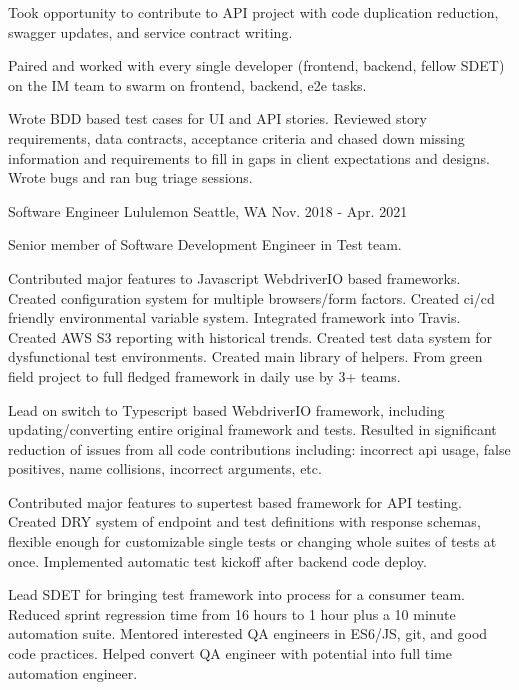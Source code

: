 \begin{cventries}
{\begin{cvitems}
\item {Took opportunity to contribute to API project with code duplication reduction, swagger updates, and service contract writing.}
\item {Paired and worked with every single developer (frontend, backend, fellow SDET) on the IM team to swarm on frontend, backend, e2e tasks.}
\item {Wrote BDD based test cases for UI and API stories. Reviewed story requirements, data contracts, acceptance criteria and chased down missing information and requirements to fill in gaps in client expectations and designs. Wrote bugs and ran bug triage sessions.}
\end{cvitems}
}

\cventry
{Software Engineer} %
{Lululemon} %
{Seattle, WA} %
{Nov. 2018 - Apr. 2021} %
{
\begin{cvitems}
\item[] {Senior member of Software Development Engineer in Test team.}
\item[]
\item {Contributed major features to Javascript WebdriverIO based frameworks. Created configuration system for multiple browsers/form factors. Created ci/cd friendly environmental variable system. Integrated framework into Travis. Created AWS S3 reporting with historical trends. Created test data system for dysfunctional test environments. Created main library of helpers. From green field project to full fledged framework in daily use by 3+ teams.}
\item {Lead on switch to Typescript based WebdriverIO framework, including updating/converting entire original framework and tests. Resulted in significant reduction of issues from all code contributions including: incorrect api usage, false positives, name collisions, incorrect arguments, etc.}
\item {Contributed major features to supertest based framework for API testing. Created DRY system of endpoint and test definitions with response schemas, flexible enough for customizable single tests or changing whole suites of tests at once. Implemented automatic test kickoff after backend code deploy.}
\item {Lead SDET for bringing test framework into process for a consumer team. Reduced sprint regression time from 16 hours to 1 hour plus a 10 minute automation suite. Mentored interested QA engineers in ES6/JS, git, and good code practices. Helped convert QA engineer with potential into full time automation engineer.}
\end{cvitems}
}


\end{cventries}
